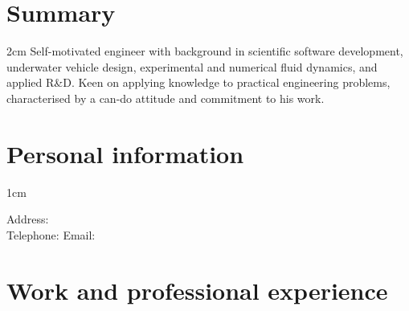 \documentclass[a4paper,10pt]{article}
\begin{document}
\pagestyle{empty} %

\par{\par\par}

\section{Summary}

\hspace{1cm}
\begin{minipage}{\textwidth}
\begin{adjustwidth}{}{2cm} %
	Self-motivated engineer with background in scientific
		software development, underwater vehicle design, experimental
		and numerical fluid dynamics, and applied R\&D.
	Keen on applying knowledge to practical engineering problems,
		characterised by a can-do attitude and commitment to his work.
\end{adjustwidth}
\end{minipage}

\section{Personal information}

\begin{minipage}{\textwidth}
\begin{adjustwidth}{}{1cm} %

Address: \\
Telephone: \hspace{2cm} Email:

\end{adjustwidth}
\end{minipage}


\section{Work and professional experience}
\end{document}
